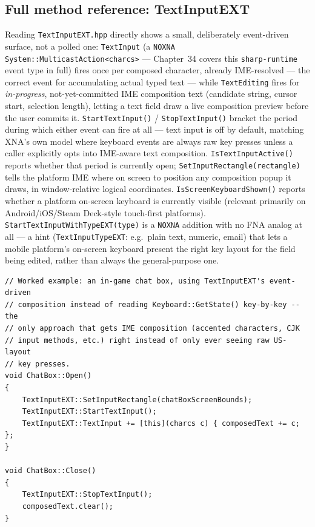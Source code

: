 \subsection{Full method reference: TextInputEXT}

Reading \texttt{TextInputEXT.hpp} directly shows a small, deliberately event-driven surface,
not a polled one: \texttt{TextInput} (a \texttt{NOXNA System::MulticastAction<charcs>} ---
Chapter~34 covers this \texttt{sharp-runtime} event type in full) fires once per composed
character, already IME-resolved --- the correct event for accumulating actual typed text ---
while \texttt{TextEditing} fires for \emph{in-progress}, not-yet-committed IME composition text
(candidate string, cursor start, selection length), letting a text field draw a live composition
preview before the user commits it. \texttt{StartTextInput()} / \texttt{StopTextInput()} bracket
the period during which either event can fire at all --- text input is off by default, matching
XNA's own model where keyboard events are always raw key presses unless a caller explicitly
opts into IME-aware text composition. \texttt{IsTextInputActive()} reports whether that period
is currently open; \texttt{SetInputRectangle(rectangle)} tells the platform IME where on screen
to position any composition popup it draws, in window-relative logical coordinates.
\texttt{IsScreenKeyboardShown()} reports whether a platform on-screen keyboard is currently
visible (relevant primarily on Android/iOS/Steam Deck-style touch-first platforms).
\texttt{StartTextInputWithTypeEXT(type)} is a \texttt{NOXNA} addition with no FNA analog at
all --- a hint (\texttt{TextInputTypeEXT}: e.g.\ plain text, numeric, email) that lets a mobile
platform's on-screen keyboard present the right key layout for the field being edited, rather
than always the general-purpose one.

\begin{lstlisting}
// Worked example: an in-game chat box, using TextInputEXT's event-driven
// composition instead of reading Keyboard::GetState() key-by-key -- the
// only approach that gets IME composition (accented characters, CJK
// input methods, etc.) right instead of only ever seeing raw US-layout
// key presses.
void ChatBox::Open()
{
    TextInputEXT::SetInputRectangle(chatBoxScreenBounds);
    TextInputEXT::StartTextInput();
    TextInputEXT::TextInput += [this](charcs c) { composedText += c; };
}

void ChatBox::Close()
{
    TextInputEXT::StopTextInput();
    composedText.clear();
}
\end{lstlisting}

